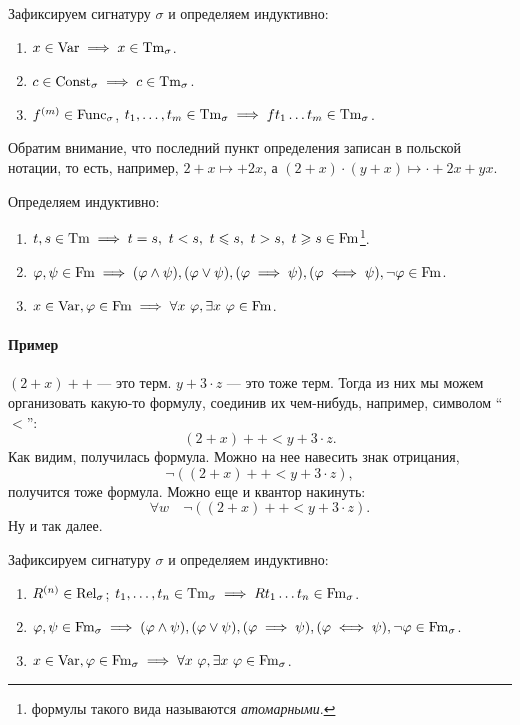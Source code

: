 \begin{definition}
    Зафиксируем сигнатуру $\sigma$ и определяем индуктивно:
    \begin{enumerate}
        \item $x \in \mathrm{Var} \implies x \in \mathrm{Tm}_{\sigma}$.
        \item $c \in \mathrm{Const}_{\sigma} \implies c \in \mathrm{Tm}_{\sigma}$.
        \item $f^{(m)} \in \mathrm{Func}_{\sigma}$, $t_{1}, \ldots, t_{m} \in \mathrm{Tm}_{\sigma} \implies f t_{1} \ldots t_{m} \in \mathrm{Tm}_{\sigma}$.
    \end{enumerate}
\end{definition}
Обратим внимание, что последний пункт определения записан в польской нотации, то есть, например, $2 + x \mapsto +2x$, а $(2 + x) \cdot (y + x) \mapsto \cdot +2x +yx$.

\begin{definition}
    Определяем индуктивно:
    \begin{enumerate}
        \item $t, s \in \mathrm{Tm} \implies t = s,~t < s,~t \leqslant s,~t > s,~t \geqslant s \in \mathrm{Fm}$\footnote{формулы такого вида называются {\it атомарными}.}.
        \item $\varphi, \psi \in \mathrm{Fm} \implies (\varphi \land \psi), (\varphi \lor \psi), (\varphi \implies \psi), (\varphi \iff \psi), \neg \varphi \in \mathrm{Fm}$.
        \item $x \in \mathrm{Var}, \varphi \in \mathrm{Fm} \implies \forall x~\varphi, \exists x~\varphi \in \mathrm{Fm}$.
    \end{enumerate}
\end{definition}

\paragraph{Пример} $(2 + x)++$ --- это терм.
$y + 3 \cdot z$ --- это тоже терм.
Тогда из них мы можем организовать какую-то формулу, соединив их чем-нибудь, например, символом \enquote{$<$}:
$$
    (2 + x)++ < y + 3 \cdot z.
$$
Как видим, получилась формула.
Можно на нее навесить знак отрицания,
$$
    \neg \left((2 + x)++ < y + 3 \cdot z\right),
$$
получится тоже формула.
Можно еще и квантор накинуть:
$$
    \forall w \quad \neg \left((2 + x)++ < y + 3 \cdot z\right).
$$
Ну и так далее.

\begin{definition}
    Зафиксируем сигнатуру $\sigma$ и определяем индуктивно:
    \begin{enumerate}
        \item $R^{(n)} \in \mathrm{Rel}_{\sigma}$; $t_{1}, \ldots, t_{n} \in \mathrm{Tm}_{\sigma} \implies R t_{1} \ldots t_{n} \in \mathrm{Fm}_{\sigma}$.
        \item $\varphi, \psi \in \mathrm{Fm}_{\sigma} \implies (\varphi \land \psi), (\varphi \lor \psi), (\varphi \implies \psi), (\varphi \iff \psi), \neg \varphi \in \mathrm{Fm}_{\sigma}$.
        \item $x \in \mathrm{Var}, \varphi \in \mathrm{Fm}_{\sigma} \implies \forall x~\varphi, \exists x~\varphi \in \mathrm{Fm}_{\sigma}$.
    \end{enumerate}
\end{definition}

